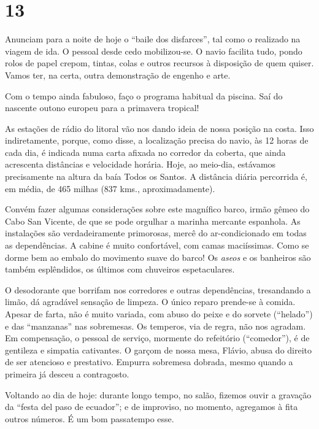 \section*{13 \adfflatleafright {}}
Anunciam para a noite de hoje o ``baile dos disfarces'', tal como o realizado na viagem de ida. O pessoal desde cedo mobilizou-se. O navio facilita tudo, pondo rolos de papel crepom, tintas, colas e outros recursos à disposição de quem quiser. Vamos ter, na certa, outra demonstração de engenho e arte.

Com o tempo ainda fabuloso, faço o programa habitual da piscina. Saí do nascente outono europeu para a primavera tropical!

As estações de rádio do litoral vão nos dando ideia de nossa posição na costa. Isso indiretamente, porque, como disse, a localização precisa do navio, às 12 horas de cada dia, é indicada numa carta afixada no corredor da coberta, que ainda acrescenta distâncias e velocidade horária. Hoje, ao meio-dia, estávamos precisamente na altura da baía Todos os Santos. A distância diária percorrida é, em média, de 465 milhas (837 kms., aproximadamente).

Convém fazer algumas considerações sobre este magnífico barco, irmão gêmeo do Cabo San Vicente, de que se pode orgulhar a marinha mercante espanhola. As instalações são verdadeiramente primorosas, mercê do ar-condicionado em todas as dependências. A cabine é muito confortável, com camas maciíssimas. Como se dorme bem ao embalo do movimento suave do barco! Os \textit{aseos} e os banheiros são também esplêndidos, os últimos com chuveiros espetaculares.

O desodorante que borrifam nos corredores e outras dependências, tresandando a limão, dá agradável sensação de limpeza. O único reparo prende-se à comida. Apesar de farta, não é muito variada, com abuso do peixe e do sorvete (``helado'') e das ``manzanas'' nas sobremesas. Os temperos, via de regra, não nos agradam. Em compensação, o pessoal de serviço, mormente do refeitório (``comedor''), é de gentileza e simpatia cativantes. O garçom de nossa mesa, Flávio, abusa do direito de ser atencioso e prestativo. Empurra sobremesa dobrada, mesmo quando a primeira já desceu a contragosto.

Voltando ao dia de hoje: durante longo tempo, no salão, fizemos ouvir a gravação da ``festa del paso de ecuador''; e de improviso, no momento, agregamos à fita outros números. É um bom passatempo esse.

